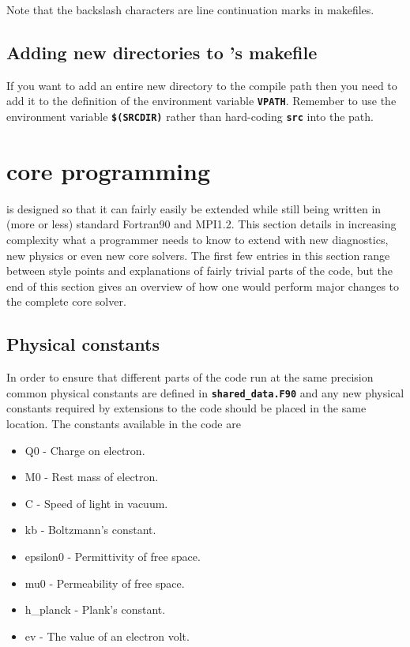 \documentclass[12pt,a4paper]{article}
\newcommand{\inlinecode}[1]{{\color{warwickred} \bf\texttt{#1}}}
\newcommand{\EPOCH}{{\color{warwickdark}\fontfamily{phv}\selectfont{EPOCH}}}
\begin{document}
Note that the backslash characters are line continuation marks in makefiles.

\subsection{Adding new directories to {\EPOCH}'s makefile}
If you want to add an entire new directory to the {\EPOCH} compile path then
you need to add it to the definition of the environment variable
\inlinecode{VPATH}. Remember to use the environment variable
\inlinecode{\$(SRCDIR)} rather than hard-coding \inlinecode{src} into the path.

\section{{\EPOCH} core programming}

{\EPOCH} is designed so that it can fairly easily be extended while still being
written in (more or less) standard Fortran90 and MPI1.2. This section details
in increasing complexity what a programmer needs to know to extend {\EPOCH} with
new diagnostics, new physics or even new core solvers. The first few entries
in this section range between style points and explanations of fairly trivial
parts of the {\EPOCH} code, but the end of this section gives an overview of how
one would perform major changes to the complete {\EPOCH} core solver.

\subsection{Physical constants}
In order to ensure that different parts of the code run at the same precision
common physical constants are defined in \inlinecode{shared\_data.F90} and any
new physical constants required by extensions to the code should be placed in
the same location. The constants available in the code are
\begin{itemize}
\item Q0 - Charge on electron.
\item M0 - Rest mass of electron.
\item C - Speed of light in vacuum.
\item kb - Boltzmann's constant.
\item epsilon0 - Permittivity of free space.
\item mu0 - Permeability of free space.
\item h\_planck - Plank's constant.
\item ev - The value of an electron volt.
\end{itemize}
\end{document}
